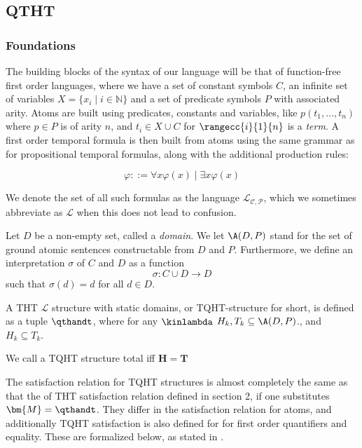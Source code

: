 \subsection{QTHT}

\subsubsection{Foundations}

The building blocks of the syntax of our language will be that of
function-free first order languages, where we have a set of constant
symbols $C$, an infinite set of variables
$X=\{x_i \mid i\in \mathbb{N} \}$ and a set of predicate symbols $P$
with associated arity. Atoms are built using predicates, constants and
variables, like $p(t_1,\dots, t_n)$ where $p\in P$ is of arity $n$, and
$t_i \in X \cup C$ for $\rangecc{i}{1}{n}$ is a \emph{term}. A first
order temporal formula is then built from atoms using the same grammar
as for propositional temporal formulas, along with the additional
production rules:

$$
\varphi ::= \forall x \varphi(x) \mid \exists x \varphi(x)
$$

We denote the set of all such formulas as the language
$\mathcal{L_{C,P}}$, which we sometimes abbreviate as $\mathcal{L}$
when this does not lead to confusion.

Let $D$ be a non-empty set, called a \emph{domain}. We let $\A(D,P)$
stand for the set of ground atomic sentences constructable from $D$
and $P$. Furthermore, we define an interpretation $\sigma$ of $C$ and
$D$ as a function
$$
\sigma: C \cup D \rightarrow D
$$
such that $\sigma(d) = d$ for all $d \in D$.

\begin{definition}
  A THT $\mathcal{L}$ structure with static domains, or TQHT-structure
  for short, is defined as a tuple $\qthandt$, where for any
  $\kinlambda$ $H_k,T_k \subseteq \A(D,P)$., and $H_k \subseteq T_k$.

  We call a TQHT structure total iff $\bm{H}=\bm{T}$
\end{definition}

The satisfaction relation for TQHT structures is almost completely the
same as that the of THT satisfaction relation defined in section 2, if
one substitutes $\bm{M}=\qthandt$. They differ in the satisfaction
relation for atoms, and additionally TQHT satisfaction is also defined
for for first order quantifiers and equality. These are formalized
below, as stated in \cite{agcapevidi17a}.


